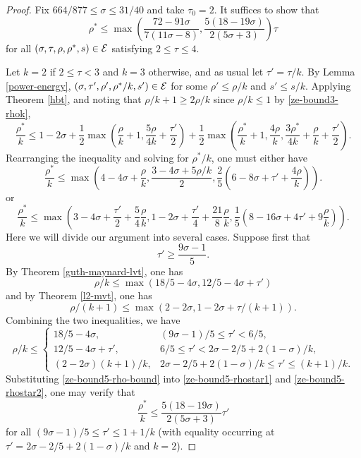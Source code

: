 \begin{proof}
Fix $664/877 \le \sigma \le 31/40$ and take $\tau_0 = 2$. It suffices to show that
\[
\rho^* \le \max\left(\frac{72 - 91\sigma}{7(11\sigma - 8)}, \frac{5(18 - 19\sigma)}{2(5\sigma + 3)}\right)\tau
\]
for all $(\sigma, \tau, \rho, \rho^*, s) \in \mathcal{E}$ satisfying $2 \le \tau \le 4$.

Let $k = 2$ if $2 \le \tau < 3$ and $k = 3$ otherwise, and as usual let $\tau' = \tau/k$. By Lemma \ref{power-energy}, $(\sigma, \tau', \rho', \rho^*/k, s') \in \mathcal{E}$ for some $\rho' \le \rho/k$ and $s' \le s/k$. Applying Theorem \ref{hbt}, and noting that $\rho/k + 1 \ge 2\rho/k$ since $\rho/k \le 1$ by \eqref{ze-bound3-rhok},
\[
\frac{\rho^*}{k} \le 1-2\sigma + \frac{1}{2}\max(\frac{\rho}{k}+1, \frac{5\rho}{4k} + \frac{\tau'}{2}) + \frac{1}{2}\max(\frac{\rho^*}{k}+1, \frac{4\rho}{k}, \frac{3\rho^*}{4k} +\frac{\rho}{k}+\frac{\tau'}{2}).
\]
Rearranging the inequality and solving for $\rho^*/k$, one must either have
\begin{equation}\label{ze-bound5-rhostar1}
\frac{\rho^*}{k} \le \max(4 - 4\sigma + \frac{\rho}{k}, \frac{3 - 4\sigma + 5\rho/k}{2}, \frac{2}{5}(6 - 8\sigma + \tau' + \frac{4\rho}{k})).
\end{equation}
or
\begin{equation}\label{ze-bound5-rhostar2}
\frac{\rho^*}{k} \le \max(3 - 4\sigma + \frac{\tau'}{2} + \frac{5}{4}\frac{\rho}{k}, 1 - 2\sigma + \frac{\tau'}{4} + \frac{21}{8}\frac{\rho}{k}, \frac{1}{5}(8 - 16\sigma + 4\tau' + 9\frac{\rho}{k})).
\end{equation}
Here we will divide our argument into several cases. Suppose first that
\[
\tau' \ge \frac{9\sigma - 1}{5}.
\]
By Theorem \ref{guth-maynard-lvt}, one has
\[
\rho/k \le \max(18/5 - 4\sigma, 12/5 - 4\sigma + \tau')
\]
and by Theorem \ref{l2-mvt}, one has
\[
\rho/(k + 1) \le \max(2 - 2\sigma, 1 - 2\sigma + \tau/(k + 1)).
\]
Combining the two inequalities, we have
\begin{equation}\label{ze-bound5-rho-bound}
\rho/k \le \begin{cases}
18/5 - 4\sigma,& (9\sigma - 1)/5 \le \tau' < 6/5,\\
12/5 - 4\sigma + \tau',& 6/5 \le \tau' < 2\sigma - 2/5 + 2(1 - \sigma)/k,\\
(2 - 2\sigma)(k + 1)/k,& 2\sigma - 2/5 + 2(1 - \sigma)/k \le \tau' \le (k + 1)/k.
\end{cases}
\end{equation}
Substituting \eqref{ze-bound5-rho-bound} into \eqref{ze-bound5-rhostar1} and \eqref{ze-bound5-rhostar2}, one may verify that
\[
\frac{\rho^*}{k} \le \frac{5(18 - 19\sigma)}{2(5\sigma + 3)}\tau'
\]
for all $(9\sigma - 1)/5 \le \tau' \le 1 + 1/k$ (with equality occurring at $\tau' = 2\sigma - 2/5 + 2(1 - \sigma)/k$ and $k = 2$).


\end{proof}
